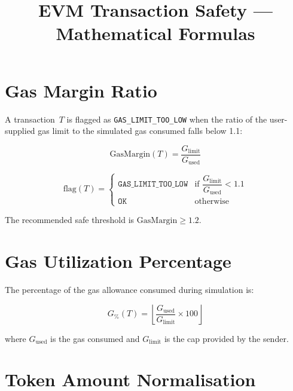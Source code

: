 \documentclass{article}
\title{EVM Transaction Safety --- Mathematical Formulas}
\author{}
\date{}
\begin{document}
\maketitle

\section{Gas Margin Ratio}

A transaction~\(T\) is flagged as \texttt{GAS\_LIMIT\_TOO\_LOW} when the ratio
of the user-supplied gas limit to the simulated gas consumed falls below 1.1:

\begin{equation}
  \text{GasMargin}(T) = \frac{G_{\text{limit}}}{G_{\text{used}}}
\end{equation}

\begin{equation}
  \text{flag}(T) =
  \begin{cases}
    \texttt{GAS\_LIMIT\_TOO\_LOW} & \text{if } \dfrac{G_{\text{limit}}}{G_{\text{used}}} < 1.1 \\[8pt]
    \texttt{OK}                   & \text{otherwise}
  \end{cases}
\end{equation}

The recommended safe threshold is \(\text{GasMargin} \geq 1.2\).

\section{Gas Utilization Percentage}

The percentage of the gas allowance consumed during simulation is:

\begin{equation}
  G_{\%}(T) = \left\lfloor \frac{G_{\text{used}}}{G_{\text{limit}}} \times 100 \right\rfloor
\end{equation}

where \(G_{\text{used}}\) is the gas consumed and \(G_{\text{limit}}\) is the
cap provided by the sender.

\section{Token Amount Normalisation}
\end{document}
